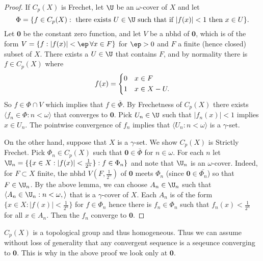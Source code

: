 \documentclass{article}
\begin{document}
\begin{proof} 
    If \(C_p(X)\) is Frechet, let \(\U\) be an \(\omega\)-cover of \(X\) and let 
    \[
    \Phi = \{f \in C_p(X):\text{ there exists } U \in \U \text{ such that if } |f(x)| < 1 \text{ then } x \in U\}.
    \] 
    Let \(\mathbf{0}\) be the constant zero function, and let \(V\) be a nbhd of \(\mathbf{0}\), which is of the form \(V = \{f: |f(x)|< \ep \,\forall x \in F\}\) for \(\ep > 0\) and \(F\) a finite (hence closed) subset of \(X\). There exists a \(U \in \U\) that contains \(F\), and by normality there is \(f \in C_p(X)\) where 
    \begin{align*}
        f(x)  = \begin{dcases}
        0 &  x \in F\\
        1 & x \in X - U.
        \end{dcases}
    \end{align*}
    So \(f \in \Phi\cap V\) which implies that \(f \in \overline{\Phi}\).  By Frechetness of \(C_p(X)\) there exists \(\langle f_n \in \Phi : n < \omega\rangle\) that converges to \(\mathbf{0}\). Pick \(U_n \in \U\) such that \(|f_n(x)| < 1\) implies \(x \in U_n\). The pointwise convergence of \(f_n\) implies that \(\langle U_n: n < \omega\rangle\) is a \(\gamma\)-set.

    On the other hand, suppose that \(X\) is a \(\gamma\)-set. We show \(C_p(X)\) is Strictly Frechet. Pick \(\Phi_n \in C_p(X)\) such that \(\mathbf{0} \in \overline{\Phi}\) for \(n \in \omega\). For each \(n\) let \(\U_n = \{\{x \in X : |f(x)| < \frac{1}{2^n}\}: f \in \Phi_n\}\) and note that \(\U_n\) is an \(\omega\)-cover. Indeed, for \(F \subset X\) finite, the nbhd \(V(F, \frac{1}{2^n})\) of \(\mathbf{0}\) meets \(\Phi_n\) (since \(\mathbf{0} \in \overline{\Phi_n}\)) so that \(F \in \U_n\). By the above lemma, we can choose \(A_n \in \U_n\) such that \(\langle A_n \in \U_n : n < \omega, \rangle\) that is a \(\gamma\)-cover of \(X\). Each \(A_n\) is of the form \(\{x \in X : |f(x)| < \frac{1}{2^n}\}\) for \(f \in \Phi_n\) hence there is \(f_n \in \Phi_n\) such that \(f_n(x) < \frac{1}{2^n}\) for all \(x \in A_n\). Then the \(f_n\) converge to \(\mathbf{0}\).
\end{proof}
\begin{rem}
    \(C_p(X)\) is a topological group and thus homogeneous. Thus we can assume without loss of generality that any convergent sequence is a seqeunce converging to  \(\mathbf{0}\). This is why in the above proof we look only at \(\mathbf{0}\).
\end{rem}
\end{document}

